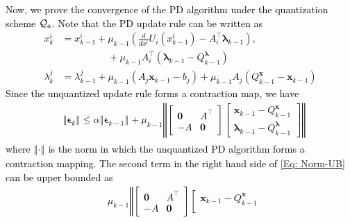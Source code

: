 \documentclass[10pt,twocolumn,twoside]{IEEEtran}
\begin{document}
\textcolor{black}{Now, we prove the convergence of the PD algorithm under the quantization scheme $\mathcal{Q}_{\rm a}$. Note that the PD update rule can be written as 
\begin{align}
{x}^{i}_{k}&=x^{i}_{k-1}+\mu_{k-1} {\left({\frac{d }{d x^i}U_i{\left({x^i_{k-1}}\right)}-A^\top_i{\ensuremath{\boldsymbol{{\lambda}}}}_{k-1}}\right)},\nonumber  \\
&\hspace{2cm}+\mu_{k-1}A^\top_i{\left({{\ensuremath{\boldsymbol{{\lambda}}}}_{k-1}-Q^{{\ensuremath{\boldsymbol{{\lambda}}}}}_{k-1}}\right)}\nonumber\\
{\lambda}^{j}_{k}&=\lambda^j_{k-1}+\mu_{k-1}{\left({A_j{\ensuremath{\boldsymbol{{x}}}}_{k-1}-b_j}\right)}+\mu_{k-1}A_j{\left({Q^{{\ensuremath{\boldsymbol{{x}}}}}_{k-1}-{\ensuremath{\boldsymbol{{x}}}}_{k-1}}\right)}\nonumber
\end{align}
Since the unquantized update rule forms a contraction map, we have 
\begin{align}\label{Eq: Norm-UB}
&{\left\Vert{
{\ensuremath{\boldsymbol{{\epsilon}}}}_k}\right\Vert_{{}}}\leq\alpha {\left\Vert{{\ensuremath{\boldsymbol{{\epsilon}}}}_{k-1}}\right\Vert_{{}}}+ \mu_{k-1}
{\left\Vert{
\left[
\begin{array}{cc}
{\ensuremath{\boldsymbol{{0}}}}&A^\top\\
-A&{\ensuremath{\boldsymbol{{0}}}}
\end{array}
\right]\left[
\begin{array}{c}
{\ensuremath{\boldsymbol{{x}}}}_{k-1}-{\ensuremath{Q^{{{\ensuremath{\boldsymbol{{x}}}}}}_{{k-1}}}}\\
{\ensuremath{\boldsymbol{{\lambda}}}}_{k-1}-{\ensuremath{Q^{{{\ensuremath{\boldsymbol{{\lambda}}}}}}_{{k-1}}}}
\end{array}
\right]}\right\Vert_{{}}}
\end{align}
where ${\left\Vert{\cdot}\right\Vert_{{}}}$ is the norm in which the unquantized PD algorithm forms a contraction mapping. The second term in the right hand side of \eqref{Eq: Norm-UB} can be upper bounded as 
\begin{align}\label{Eq: Norm-UB-1}
& \mu_{k-1}
{\left\Vert{
\left[
\begin{array}{cc}
{\ensuremath{\boldsymbol{{0}}}}&A^\top\\
-A&{\ensuremath{\boldsymbol{{0}}}}
\end{array}
\right]\left[
\begin{array}{c}
{\ensuremath{\boldsymbol{{x}}}}_{k-1}-{\ensuremath{Q^{{{\ensuremath{\boldsymbol{{x}}}}}}_{{k-1}}}}\\

\end{array}}}
\end{align}}
\end{document}
